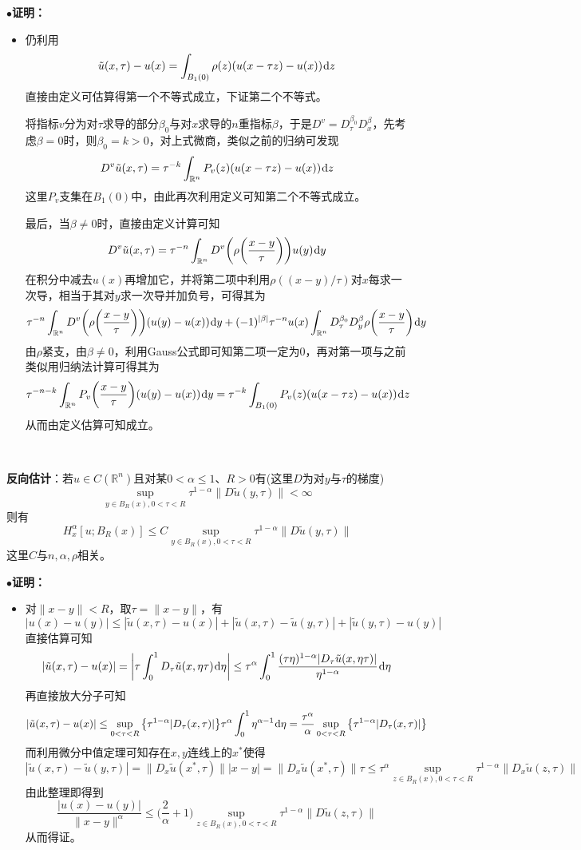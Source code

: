 \documentclass[a4paper,UTF8,fontset=windows,AutoFakeBold]{ctexart}
\newcommand*{\dr}{\hspace{0.07em}\mathrm{d}}
\newcommand{\proo}[1]{{\kaishu $\bullet$\textbf{证明：}
\begin{itemize}
    \item[] #1
\end{itemize}
}}
\begin{document}
\proo{
    仍利用
    $$\tilde{u}(x,\tau)-u(x)=\int_{B_1(0)}\rho(z)(u(x-\tau z)-u(x))\dr z$$
    直接由定义可估算得第一个不等式成立，下证第二个不等式。

    将指标$v$分为对$\tau$求导的部分$\beta_0$与对$x$求导的$n$重指标$\beta$，于是$D^v=D_\tau^{\beta_0}D_x^\beta$，先考虑$\beta=0$时，则$\beta_0=k>0$，对上式微商，类似之前的归纳可发现
    $$D^v\tilde{u}(x,\tau)=\tau^{-k}\int_{\mathbb{R}^n}P_v(z)(u(x-\tau z)-u(x))\dr z$$
    这里$P_v$支集在$B_1(0)$中，由此再次利用定义可知第二个不等式成立。

    最后，当$\beta\ne0$时，直接由定义计算可知
    $$D^v\tilde{u}(x,\tau)=\tau^{-n}\int_{\mathbb{R}^n}D^v\bigg(\rho\bigg(\frac{x-y}{\tau}\bigg)\bigg)u(y)\dr y$$
    在积分中减去$u(x)$再增加它，并将第二项中利用$\rho((x-y)/\tau)$对$x$每求一次导，相当于其对$y$求一次导并加负号，可得其为
    $$\tau^{-n}\int_{\mathbb{R}^n}D^v\bigg(\rho\bigg(\frac{x-y}{\tau}\bigg)\bigg)(u(y)-u(x))\dr y+(-1)^{|\beta|}\tau^{-n}u(x)\int_{\mathbb{R}^n}D_\tau^{\beta_0}D_y^\beta\rho\bigg(\frac{x-y}{\tau}\bigg)\dr y$$
    由$\rho$紧支，由$\beta\ne0$，利用Gauss公式即可知第二项一定为0，再对第一项与之前类似用归纳法计算可得其为
    $$\tau^{-n-k}\int_{\mathbb{R}^n}P_v\bigg(\frac{x-y}{\tau}\bigg)(u(y)-u(x))\dr y=\tau^{-k}\int_{B_1(0)}P_v(z)(u(x-\tau z)-u(x))\dr z$$
    从而由定义估算可知成立。
}

\

\textbf{反向估计}：若$u\in C(\mathbb{R}^n)$且对某$0<\alpha\le1$、$R>0$有(这里$D$为对$y$与$\tau$的梯度)
$$\sup_{y\in B_R(x),0<\tau<R}\tau^{1-\alpha}\|D\tilde{u}(y,\tau)\|<\infty$$
则有
$$H_x^\alpha[u;B_R(x)]\le C\sup_{y\in B_R(x),0<\tau<R}\tau^{1-\alpha}\|D\tilde{u}(y,\tau)\|$$
这里$C$与$n,\alpha,\rho$相关。

\proo{
    对$\|x-y\|<R$，取$\tau=\|x-y\|$，有
    $$|u(x)-u(y)|\le|\tilde{u}(x,\tau)-u(x)|+|\tilde{u}(x,\tau)-\tilde{u}(y,\tau)|+|\tilde{u}(y,\tau)-u(y)|$$
    直接估算可知
    $$|\tilde{u}(x,\tau)-u(x)|=\bigg|\tau\int_0^1D_\tau\tilde{u}(x,\eta\tau)\dr\eta\bigg|\le\tau^\alpha\int_0^1\frac{(\tau\eta)^{1-\alpha}|D_\tau\tilde{u}(x,\eta\tau)|}{\eta^{1-\alpha}}\dr\eta$$
    再直接放大分子可知
    $$|\tilde{u}(x,\tau)-u(x)|\le\sup_{0<\tau<R}\big\{\tau^{1-\alpha}|D_\tau(x,\tau)|\big\}\tau^\alpha\int_0^1\eta^{\alpha-1}\dr\eta=\frac{\tau^\alpha}{\alpha}\sup_{0<\tau<R}\big\{\tau^{1-\alpha}|D_\tau(x,\tau)|\big\}$$
    而利用微分中值定理可知存在$x,y$连线上的$x^*$使得
    $$|\tilde{u}(x,\tau)-\tilde{u}(y,\tau)|=\|D_x\tilde{u}(x^*,\tau)\||x-y|=\|D_x\tilde{u}(x^*,\tau)\|\tau\le\tau^\alpha\sup_{z\in B_R(x),0<\tau<R}\tau^{1-\alpha}\|D_x\tilde{u}(z,\tau)\|$$
    由此整理即得到
    $$\frac{|u(x)-u(y)|}{\|x-y\|^\alpha}\le\bigg(\frac{2}{\alpha}+1\bigg)\sup_{z\in B_R(x),0<\tau<R}\tau^{1-\alpha}\|D\tilde{u}(z,\tau)\|$$
    从而得证。
}
\end{document}
